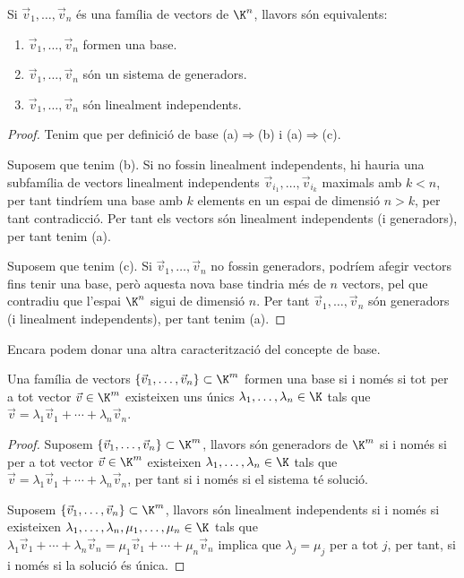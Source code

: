 \begin{proposicio}\label{prop:base=li=gen}
	Si $\vec v_1, \dots, \vec v_n$ és una família de vectors de $\K^n$, llavors són equivalents:
	\begin{enumerate}[\rm (a)]
		\item $\vec v_1, \dots, \vec v_n$ formen una base.
		\item $\vec v_1, \dots, \vec v_n$ són un sistema de generadors.
		\item $\vec v_1, \dots, \vec v_n$ són linealment independents.
	\end{enumerate}
\end{proposicio}
\begin{proof}
	Tenim que per definició de base (a)$\Rightarrow$(b) i (a)$\Rightarrow$(c).
	
	Suposem que tenim (b). Si no fossin linealment independents, hi hauria una subfamília de vectors linealment independents $\vec v_{i_1}, \dots, \vec v_{i_k}$ maximals amb $k<n$, per tant tindríem una base amb $k$ elements en un espai de dimensió $n>k$, per tant contradicció. Per tant els vectors són linealment independents (i generadors), per tant tenim (a).
	
	Suposem que tenim (c). Si $\vec v_1, \dots, \vec v_n$ no fossin generadors, podríem afegir vectors fins tenir una base, però aquesta nova base tindria més de $n$ vectors, pel que contradiu que l'espai $\K^n$ sigui de dimensió $n$. Per tant $\vec v_1, \dots, \vec v_n$ són generadors (i linealment independents), per tant tenim (a).
\end{proof}
Encara podem donar una altra caracterització del concepte de base.
\begin{teorema}\label{teo:base_coord_uniq}
    Una família de vectors $\{\vec v_1, \dots, \vec v_n\} \subset \K^m$ formen una base si i només si tot per a tot vector $\vec v\in \K^m$ existeixen uns únics $\lambda_1, \dots, \lambda_n\in\K$ tals que $\vec v=\lambda_1\vec v_1+\cdots + \lambda_n\vec v_n$.
\end{teorema}
\begin{proof}
Suposem $\{\vec v_1, \dots, \vec v_n\} \subset \K^m$, llavors són generadors de $\K^m$ si i només si per a tot vector $\vec v\in \K^m$ existeixen $\lambda_1, \dots, \lambda_n\in\K$ tals que $\vec v=\lambda_1\vec v_1+\cdots + \lambda_n\vec v_n$, per tant si i només si el sistema té solució.

Suposem $\{\vec v_1, \dots, \vec v_n\} \subset \K^m$, llavors són linealment independents si i només si existeixen $\lambda_1, \dots, \lambda_n,\mu_1,\dots, \mu_n\in\K$ tals que $\lambda_1\vec v_1+\cdots + \lambda_n\vec v_n=\mu_1\vec v_1+\cdots + \mu_n\vec v_n$ implica que $\lambda_j=\mu_j$ per a tot $j$, per tant, si i només si la solució és única.
\end{proof}


